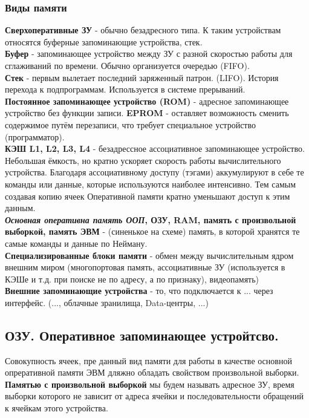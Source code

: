 \documentclass[12px]{article}
\begin{document}
\subsubsection{Виды памяти}
\textbf{Сверхоперативные ЗУ} - обычно безадресного типа. К таким устройствам относятся буферные запоминающие устройства, стек.\\
\textbf{Буфер} - запоминающее устройство между ЗУ с разной скоростью работы для сглаживаний по времени. Обычно организуется очередью (FIFO).\\
\textbf{Стек} - первым вылетает последний заряженный патрон. (LIFO). История перехода к подпрограммам. Используется в системе прерываний.\\
\textbf{Постоянное запоминающее устройство (ROM)} - адресное запоминающее устройство без функции записи.
\textbf{EPROM} - оставляет возможность сменить содержимое путём перезаписи, что требует специальное устройство (программатор).\\
\textbf{КЭШ L1, L2, L3, L4} - безадрессное ассоциативное запоминающее устройство. Небольшая ёмкость, но кратно ускоряет скорость работы вычислительного устройства. Благодаря ассоциативному доступу (тэгами) аккумулируют в себе те команды или данные, которые используются наиболее интенсивно. Тем самым создавая копию ячеек Оперативной памяти кратно уменьшают доступ к этим данным.\\
\textbf{\textit{Основная оперативна память ООП}, ОЗУ, RAM, память с произвольной выборкой, память ЭВМ} - (синенькое на схеме) память, в которой хранятся те самые команды и данные по Нейману.\\
\textbf{Специализированные блоки памяти} - обмен между вычислительным ядром внешним миром (многопортовая память, ассоциативные ЗУ (используется в КЭШе и т.д. при поиске не по адресу, а по признаку), видеопамять)\\
\textbf{Внешние запоминающие устройства} - то, что подключается к ... через интерфейс. (..., облачные зранилища, Data-центры, ...)

\subsection{ОЗУ. Оперативное запоминающее устройтсво.}
Совокупность ячеек, пре
данный вид памяти для работы в качестве основной опреративной памяти ЭВМ дляжно обладать свойством произвольной выборки. \\

\textbf{Памятью с произвольной выборкой} мы будем называть адресное ЗУ, время выборки которого не зависит от адреса ячейки и последовательности обращений к ячейкам этого устройства.\\
\end{document}
